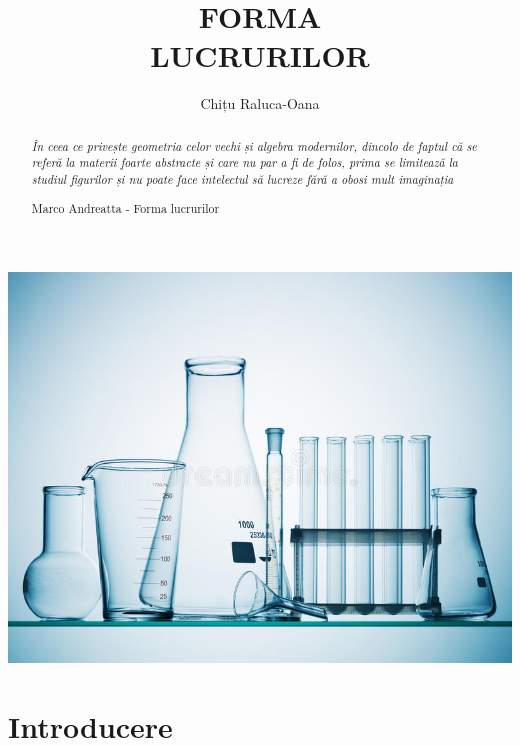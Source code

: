 \documentclass{article}
\begin{document}
\clearpage{}
\title{FORMA \\LUCRURILOR}
\author{Chițu Raluca-Oana}
\date{}

\maketitle
\clearpage{}

\begin{abstract}

\hfill\break
\hfill\break
\hfill\break
\hfill\break
\hfill\break
\hfill\break
\hfill\break
\hfill\break
\hfill\break
\hfill\break

\textit{În ceea ce privește geometria celor vechi și algebra modernilor, dincolo de faptul că se referă la materii foarte abstracte și care nu par a fi de folos,
prima se limitează la studiul figurilor și nu poate face intelectul să lucreze fără a obosi mult imaginația}
\begin{flushright}{Marco Andreatta - Forma lucrurilor}
\end{flushright}
\end{abstract}
\hfill\break
\hfill\break
\hfill\break

\begin{center}
\includegraphics{Chimie}
\end{center}


\clearpage{}

\hfill\break
\hfill\break
\hfill\break
\hfill\break
\hfill\break
\hfill\break
\hfill\break
\hfill\break
\tableofcontents
\listoftables
\clearpage{}

\section{Introducere}
\end{document}
